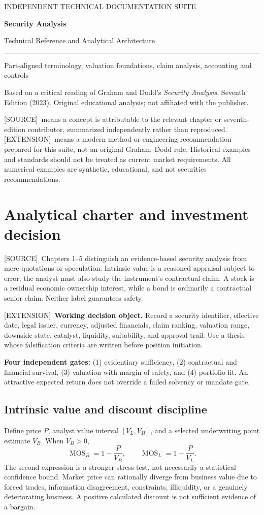 \documentclass[11pt,letterpaper]{article}
\newcommand{\term}[1]{\textbf{\color{ink}#1}}
\newcommand{\src}{\textsf{\color{sea}[SOURCE]}}
\newcommand{\ext}{\textsf{\color{gold}[EXTENSION]}}
\newcommand{\cover}[3]{%
\hypersetup{pageanchor=false}%
\begin{titlepage}\pagecolor{ink}\color{white}\vspace*{1.15in}
{\sffamily\large\color{gold}INDEPENDENT TECHNICAL DOCUMENTATION SUITE\par}\vspace{0.4in}
{\Huge\sffamily\bfseries #1\par}\vspace{0.15in}
{\Large\sffamily #2\par}\vspace{0.65in}
\color{gold}\rule{\textwidth}{2pt}\par\vspace{0.4in}
{\large #3\par}\vfill
{\small\sffamily Based on a critical reading of Graham and Dodd's \emph{Security Analysis}, Seventh Edition (2023). Original educational analysis; not affiliated with the publisher.\par}
\end{titlepage}\hypersetup{pageanchor=true}\nopagecolor\color{black}}
\newcommand{\front}[3]{\cover{#1}{#2}{#3}\tableofcontents\clearpage
\begin{sourcebox}\src\ means a concept is attributable to the relevant chapter or seventh-edition contributor, summarized independently rather than reproduced. \ext\ means a modern method or engineering recommendation prepared for this suite, not an original Graham--Dodd rule. Historical examples and standards should not be treated as current market requirements. All numerical examples are synthetic, educational, and not securities recommendations.\end{sourcebox}}
\begin{document}
\front{Security Analysis}{Technical Reference and Analytical Architecture}{Part-aligned terminology, valuation foundations, claim analysis, accounting and controls}

\section{Analytical charter and investment decision}
\src\ Chapters 1--5 distinguish an evidence-based security analysis from mere quotations or speculation. Intrinsic value is a reasoned appraisal subject to error; the analyst must also study the instrument's contractual claim. A stock is a residual economic ownership interest, while a bond is ordinarily a contractual senior claim. Neither label guarantees safety.

\ext\ \term{Working decision object.} Record a security identifier, effective date, legal issuer, currency, adjusted financials, claim ranking, valuation range, downside state, catalyst, liquidity, suitability, and approval trail. Use a thesis whose falsification criteria are written before position initiation.

\begin{methodbox}
\textbf{Four independent gates:} (1) evidentiary sufficiency, (2) contractual and financial survival, (3) valuation with margin of safety, and (4) portfolio fit. An attractive expected return does not override a failed solvency or mandate gate.
\end{methodbox}

\subsection{Intrinsic value and discount discipline}
Define price $P$, analyst value interval $[V_L,V_H]$, and a selected underwriting point estimate $V_B$. When $V_B>0$,
\[
\operatorname{MOS}_{B}=1-\frac{P}{V_B},\qquad
\operatorname{MOS}_{L}=1-\frac{P}{V_L}.
\]
The second expression is a stronger stress test, not necessarily a statistical confidence bound. Market price can rationally diverge from business value due to forced trades, information disagreement, constraints, illiquidity, or a genuinely deteriorating business. A positive calculated discount is not sufficient evidence of a bargain.
\end{document}

